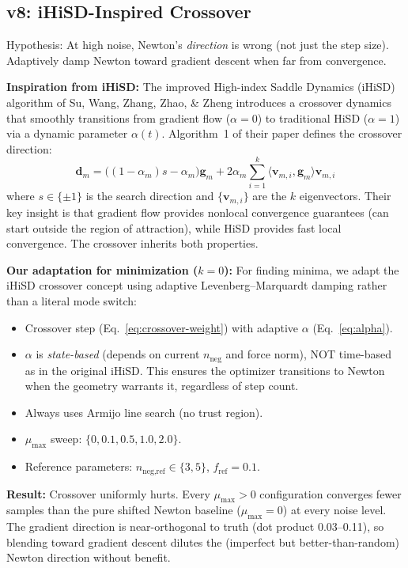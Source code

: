 \documentclass[11pt,a4paper]{article}
\newcommand{\vect}[1]{\mathbf{#1}}
\newcommand{\evec}{\vect{v}}
\begin{document}
\subsection{v8: iHiSD-Inspired Crossover}

Hypothesis: At high noise, Newton's \emph{direction} is wrong (not just the step size). Adaptively damp Newton toward gradient descent when far from convergence.

\textbf{Inspiration from iHiSD:} The improved High-index Saddle Dynamics (iHiSD) algorithm of Su, Wang, Zhang, Zhao, \& Zheng introduces a crossover dynamics that smoothly transitions from gradient flow ($\alpha = 0$) to traditional HiSD ($\alpha = 1$) via a dynamic parameter $\alpha(t)$. Algorithm~1 of their paper defines the crossover direction:
\begin{equation}
  \vect{d}_m = \bigl((1 - \alpha_m)s - \alpha_m\bigr)\vect{g}_m + 2\alpha_m \sum_{i=1}^{k}\langle\evec_{m,i}, \vect{g}_m\rangle\evec_{m,i}
\end{equation}
where $s \in \{\pm 1\}$ is the search direction and $\{\evec_{m,i}\}$ are the $k$ eigenvectors. Their key insight is that gradient flow provides nonlocal convergence guarantees (can start outside the region of attraction), while HiSD provides fast local convergence. The crossover inherits both properties.

\textbf{Our adaptation for minimization ($k=0$):} For finding minima, we adapt the iHiSD crossover concept using adaptive Levenberg--Marquardt damping rather than a literal mode switch:
\begin{itemize}
  \item Crossover step (Eq.~\ref{eq:crossover-weight}) with adaptive $\alpha$ (Eq.~\ref{eq:alpha}).
  \item $\alpha$ is \emph{state-based} (depends on current $n_\text{neg}$ and force norm), NOT time-based as in the original iHiSD. This ensures the optimizer transitions to Newton when the geometry warrants it, regardless of step count.
  \item Always uses Armijo line search (no trust region).
  \item $\mu_\text{max}$ sweep: $\{0, 0.1, 0.5, 1.0, 2.0\}$.
  \item Reference parameters: $n_\text{neg,ref} \in \{3, 5\}$, $f_\text{ref} = 0.1$.
\end{itemize}

\textbf{Result:} Crossover uniformly hurts. Every $\mu_\text{max} > 0$ configuration converges fewer samples than the pure shifted Newton baseline ($\mu_\text{max} = 0$) at every noise level. The gradient direction is near-orthogonal to truth (dot product 0.03--0.11), so blending toward gradient descent dilutes the (imperfect but better-than-random) Newton direction without benefit.
\end{document}
